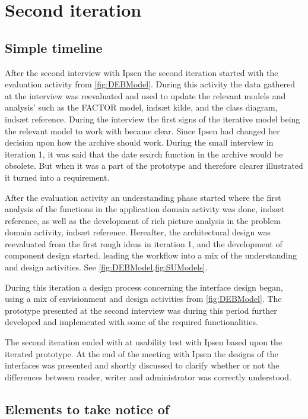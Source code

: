 \section{Second iteration}
\subsection{Simple timeline}
After the second interview with Ipsen the second iteration started with the evaluation activity from \cref{fig:DEBModel}. 
During this activity the data gathered at the interview was reevaluated and used to update the relevant models and analysis' such as the FACTOR model, {\color{red}indsæt kilde}, and the class diagram, {\color{red}indsæt reference}.
During the interview the first signs of the iterative model being the relevant model to work with became clear.
Since Ipsen had changed her decision upon how the archive should work.
 During the small interview in iteration 1, it was said that the date search function in the archive would be obsolete.
But when it was a part of the prototype and therefore clearer illustrated it turned into a requirement.

After the evaluation activity an understanding phase started where the first analysis of the functions in the application domain activity was done, {\color{red}indsæt reference}, as well as the development of rich picture analysis in the problem domain activity, {\color{red}indsæt reference}.
Hereafter, the architectural design was reevaluated from the first rough ideas in iteration 1, and the development of component design started.
leading the workflow into a mix of the understanding and design activities. 
See \cref{fig:DEBModel,fig:SUModels}.

During this iteration a design process concerning the interface design began, using a mix of envisionment and design activities from \cref{fig:DEBModel}.
The prototype presented at the second interview was during this period further developed and implemented with some of the required functionalities.

The second iteration ended with at usability test with Ipsen based upon the iterated prototype. 
At the end of the meeting with Ipsen the designs of the interfaces was presented and shortly discussed to clarify whether or not the differences between reader, writer and administrator was correctly understood.

\subsection{Elements to take notice of}
